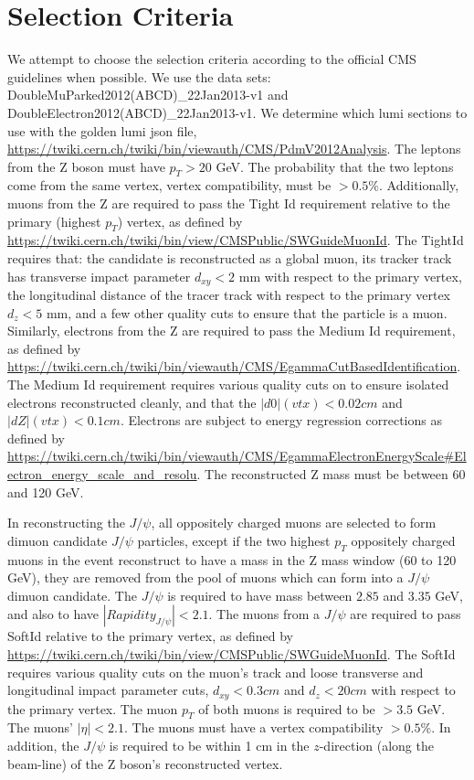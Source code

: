 \documentclass[a4paper,12pt]{article}
\begin{document}
\section{Selection Criteria}
We attempt to choose the selection criteria according to the official CMS guidelines when possible. We use the data sets: DoubleMuParked2012(ABCD){\_}22Jan2013-v1 and DoubleElectron2012(ABCD){\_}22Jan2013-v1. We determine which lumi sections to use with the golden lumi json file, \url{https://twiki.cern.ch/twiki/bin/viewauth/CMS/PdmV2012Analysis}. The leptons from the Z boson must have $p_{T} > 20$ \unit{GeV}. The probability that the two leptons come from the same vertex, vertex compatibility, must be $> 0.5\%$. Additionally, muons from the Z are required to pass the Tight Id requirement relative to the primary (highest $p_{T}$) vertex, as defined by \url{https://twiki.cern.ch/twiki/bin/view/CMSPublic/SWGuideMuonId}. The TightId requires that: the candidate is reconstructed as a global muon, its tracker track has transverse impact parameter $d_{xy} < 2$ mm with respect to the primary vertex, the longitudinal distance of the tracer track with respect to the primary vertex $d_{z} < 5$ mm, and a few other quality cuts to ensure that the particle is a muon.  Similarly, electrons from the Z are required to pass the Medium Id requirement, as defined by \url{https://twiki.cern.ch/twiki/bin/viewauth/CMS/EgammaCutBasedIdentification}. The Medium Id requirement requires various quality cuts on to ensure isolated electrons reconstructed cleanly, and that the $|d0| (vtx) < 0.02 cm$ and $|dZ| (vtx) < 0.1 cm$.  Electrons are subject to energy regression corrections as defined by \url{https://twiki.cern.ch/twiki/bin/viewauth/CMS/EgammaElectronEnergyScale#Electron_energy_scale_and_resolu}. The reconstructed Z mass must be between 60 and 120 \unit{GeV}.

In reconstructing the $J\slash \psi$, all oppositely charged muons are selected to form dimuon candidate $J\slash \psi$ particles, except if the two highest $p_{T}$ oppositely charged muons in the event reconstruct to have a mass in the Z mass window (60 to 120 \unit{GeV}), they are removed from the pool of muons which can form into a $J\slash \psi$ dimuon candidate. The $J\slash \psi$ is required to have mass between $2.85$ and $3.35$ \unit{GeV}, and also to have $|Rapidity_{J\slash \psi} |< 2.1$. The muons from a $J\slash \psi$ are required to pass SoftId relative to the primary vertex, as defined by \url{https://twiki.cern.ch/twiki/bin/view/CMSPublic/SWGuideMuonId}. The SoftId requires various quality cuts on the muon's track and loose transverse and longitudinal impact parameter cuts, $d_{xy} < 0.3 cm$ and $d_z < 20 cm$ with respect to the primary vertex. The muon $p_{T}$ of both muons is required to be $> 3.5$ \unit{GeV}. The muons' $| \eta | < 2.1$. The muons must have a vertex compatibility $> 0.5\%$. In addition, the $J\slash \psi$ is required to be within 1 \unit{cm} in the $z$-direction (along the beam-line) of the Z boson's reconstructed vertex.
\end{document}
